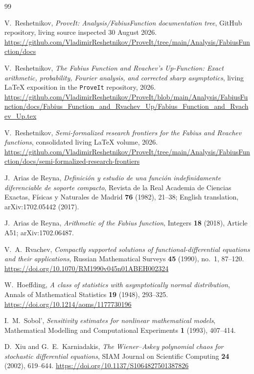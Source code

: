 \documentclass[11pt,oneside]{article}
\theoremstyle{definition}
\theoremstyle{remark}
\begin{document}
\begin{thebibliography}{99}

V.~Reshetnikov,
\emph{ProveIt: Analysis/FabiusFunction documentation tree},
GitHub repository, living source inspected 30 August 2026.
\url{https://github.com/VladimirReshetnikov/ProveIt/tree/main/Analysis/FabiusFunction/docs}

V.~Reshetnikov,
\emph{The Fabius Function and Rvachev's Up-Function: Exact arithmetic,
probability, Fourier analysis, and corrected sharp asymptotics},
living LaTeX exposition in the \texttt{ProveIt} repository, 2026.
\url{https://github.com/VladimirReshetnikov/ProveIt/blob/main/Analysis/FabiusFunction/docs/Fabius_Function_and_Rvachev_Up/Fabius_Function_and_Rvachev_Up.tex}

V.~Reshetnikov,
\emph{Semi-formalized research frontiers for the Fabius and Rvachev
functions}, consolidated living LaTeX volume, 2026.
\url{https://github.com/VladimirReshetnikov/ProveIt/tree/main/Analysis/FabiusFunction/docs/semi-formalized-research-frontiers}

J.~Arias de Reyna,
\emph{Definici\'on y estudio de una funci\'on indefinidamente diferenciable de
soporte compacto},
Revista de la Real Academia de Ciencias Exactas, F\'isicas y Naturales de
Madrid \textbf{76} (1982), 21--38;
English translation, arXiv:1702.05442 (2017).

J.~Arias de Reyna,
\emph{Arithmetic of the Fabius function},
Integers \textbf{18} (2018), Article A51;
arXiv:1702.06487.

V.~A.~Rvachev,
\emph{Compactly supported solutions of functional-differential equations and
their applications},
Russian Mathematical Surveys \textbf{45} (1990), no.~1, 87--120.
\url{https://doi.org/10.1070/RM1990v045n01ABEH002324}

W.~Hoeffding,
\emph{A class of statistics with asymptotically normal distribution},
Annals of Mathematical Statistics \textbf{19} (1948), 293--325.
\url{https://doi.org/10.1214/aoms/1177730196}

I.~M.~Sobol',
\emph{Sensitivity estimates for nonlinear mathematical models},
Mathematical Modelling and Computational Experiments \textbf{1} (1993),
407--414.

D.~Xiu and G.~E.~Karniadakis,
\emph{The Wiener--Askey polynomial chaos for stochastic differential
equations},
SIAM Journal on Scientific Computing \textbf{24} (2002), 619--644.
\url{https://doi.org/10.1137/S1064827501387826}


\end{thebibliography}
\end{document}
